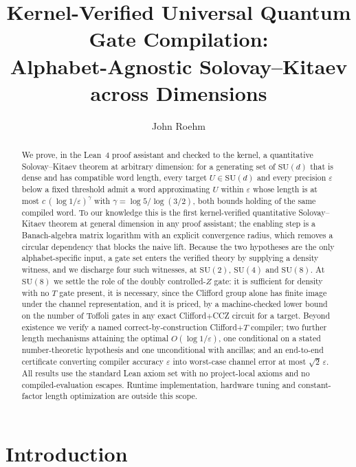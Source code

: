 \documentclass[aps,pra,reprint,nofootinbib,superscriptaddress]{revtex4-2}
\newcommand{\su}[1]{\mathrm{SU}(#1)}
\theoremstyle{plain}
\theoremstyle{definition}
\begin{document}
\title{Kernel-Verified Universal Quantum Gate Compilation:\\
Alphabet-Agnostic Solovay--Kitaev across Dimensions}

\author{John Roehm}

\begin{abstract}
We prove, in the Lean~4 proof assistant and checked to the kernel, a
quantitative Solovay--Kitaev theorem at arbitrary dimension: for a generating
set of $\su d$ that is dense and has compatible word length, every target
$U \in \su d$ and every precision $\varepsilon$ below a fixed threshold admit a
word approximating $U$ within $\varepsilon$ whose length is at most
$c\,(\log 1/\varepsilon)^{\gamma}$ with $\gamma = \log 5/\log(3/2)$, both bounds
holding of the same compiled word. To our knowledge this is the first
kernel-verified quantitative Solovay--Kitaev theorem at general dimension in
any proof assistant; the enabling step is a Banach-algebra matrix logarithm
with an explicit convergence radius, which removes a circular dependency that
blocks the naive lift. Because the two hypotheses are the only alphabet-specific
input, a gate set enters the verified theory by supplying a density witness, and
we discharge four such witnesses, at $\su 2$, $\su 4$ and $\su 8$. At $\su 8$ we
settle the role of the doubly controlled-$Z$ gate: it is sufficient for density
with no $T$ gate present, it is necessary, since the Clifford group alone has
finite image under the channel representation, and it is priced, by a
machine-checked lower bound on the number of Toffoli gates in any exact
Clifford$+$CCZ circuit for a target. Beyond existence we verify a named
correct-by-construction Clifford$+T$ compiler; two further length mechanisms
attaining the optimal $O(\log 1/\varepsilon)$, one conditional on a stated
number-theoretic hypothesis and one unconditional with ancillas; and an
end-to-end certificate converting compiler accuracy $\varepsilon$ into
worst-case channel error at most $\sqrt 2\,\varepsilon$. All results use the
standard Lean axiom set with no project-local axioms and no compiled-evaluation
escapes. Runtime implementation, hardware tuning and constant-factor length
optimization are outside this scope.
\end{abstract}

\maketitle

\section{Introduction}
\label{sec:intro}
\end{document}
